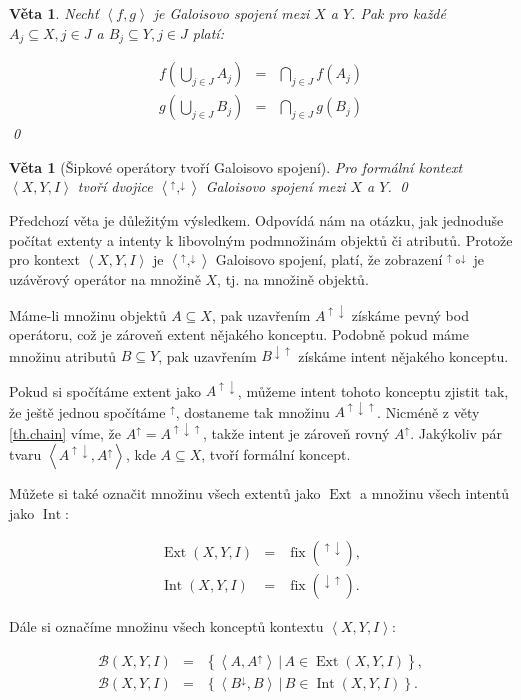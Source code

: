 \documentclass[12pt]{article}
\newcommand{\sep}{\,|\,}
\newcommand{\adds}[1]{\left\{#1\right\}}
\newcommand{\addsp}[1]{\left<#1\right>}
\DeclareMathOperator{\fix}{fix}
\DeclareMathOperator{\ext}{Ext}
\DeclareMathOperator{\intfca}{Int}
\newcommand{\context}{\addsp{X, Y, I}}
\newcommand{\lattice}{\mathcal{B}(X, Y, I)}
\newcommand{\up}{^{\uparrow}}
\newcommand{\down}{^{\downarrow}}
\newcommand{\updown}{^{\uparrow\downarrow}}
\newcommand{\downup}{^{\downarrow\uparrow}}
\newtheorem{theorem}[mydef]{Věta}
\begin{document}
\begin{theorem}
Nechť $\addsp{f,g}$ je Galoisovo spojení mezi $X$ a $Y$. Pak pro každé $A_j\subseteq X, j\in J$ a $B_j\subseteq Y, j\in J$ platí:

\begin{eqnarray}
f(\bigcup_{j\in J}A_j)&=&\bigcap_{j\in J}f(A_j)\\
g(\bigcup_{j\in J}B_j)&=&\bigcap_{j\in J}g(B_j)
\end{eqnarray}
\qed\end{theorem}

\begin{theorem}[Šipkové operátory tvoří Galoisovo spojení]
Pro formální kontext $\context$ tvoří dvojice $\addsp{\up, \down}$ Galoisovo spojení mezi $X$ a $Y$.
\qed\end{theorem}

Předchozí věta je důležitým výsledkem. Odpovídá nám na otázku, jak jednoduše počítat extenty a intenty k libovolným podmnožinám objektů či atributů. Protože pro kontext $\context$ je $\addsp{\up, \down}$ Galoisovo spojení, platí, že zobrazení $\up\circ\down$ je uzávěrový operátor na množině $X$, tj. na množině objektů. 

Máme-li množinu objektů $A \subseteq X$, pak uzavřením $A\updown$ získáme pevný bod operátoru, což je zároveň extent nějakého konceptu. Podobně pokud máme množinu atributů $B \subseteq Y$, pak uzavřením $B\downup$ získáme intent nějakého konceptu. 

Pokud si spočítáme extent jako $A\updown$, můžeme intent tohoto konceptu zjistit tak, že ještě jednou spočítáme $\up$, dostaneme tak množinu $A^{\uparrow\downarrow\uparrow}$. Nicméně z věty \ref{th.chain} víme, že $A\up = A^{\uparrow\downarrow\uparrow}$, takže intent je zároveň rovný $A\up$. Jakýkoliv pár tvaru $\addsp{A\updown, A\up}$, kde $A\subseteq X$, tvoří formální koncept. 

Můžete si také označit množinu všech extentů jako $\ext$ a množinu všech intentů jako $\intfca$:

\begin{eqnarray}
\ext(X, Y, I)&=&\fix(\updown),\\
\intfca(X, Y, I)&=&\fix(\downup).
\end{eqnarray}

Dále si označíme množinu všech konceptů kontextu $\addsp{X,Y,I}$:

\begin{eqnarray}
\lattice&=&\adds{\addsp{A, A\up}\sep A\in\ext(X,Y,I)},\\
\lattice&=&\adds{\addsp{B\down, B}\sep B\in\intfca(X,Y,I)}.
\end{eqnarray}
\end{document}
